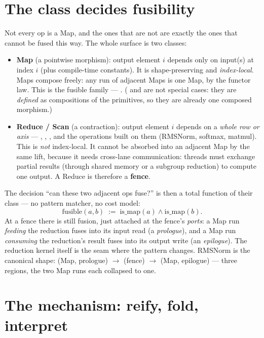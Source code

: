 \documentclass[11pt]{article}
\begin{document}
\section{The class decides fusibility}
\label{sec:class}

Not every op is a Map, and the ones that are not are exactly the ones that cannot be fused this way. The
whole surface is two classes:

\begin{itemize}[leftmargin=1.4em,itemsep=2pt]
\item \textbf{Map} (a pointwise morphism): output element $i$ depends only on input(s) at index $i$
(plus compile-time constants). It is shape-preserving and \emph{index-local}. Maps compose freely: any
run of adjacent Maps is one Map, by the functor law. This is the fusible family ---
. ( and  are
not special cases: they are \emph{defined} as compositions of the primitives, so they are already one
composed morphism.)
\item \textbf{Reduce / Scan} (a contraction): output element $i$ depends on a \emph{whole row or axis}
--- , , , and the operations built on them (RMSNorm, softmax, matmul).
This is \emph{not} index-local. It cannot be absorbed into an adjacent Map by the same lift, because it
needs cross-lane communication: threads must exchange partial results (through shared memory or a
subgroup reduction) to compute one output. A Reduce is therefore a \textbf{fence}.
\end{itemize}

The decision ``can these two adjacent ops fuse?'' is then a total function of their class --- no pattern
matcher, no cost model:
\[
\mathrm{fusible}(a,b)\;:=\;\mathrm{is\_map}(a)\wedge\mathrm{is\_map}(b).
\]
At a fence there is still fusion, just attached at the fence's \emph{ports}: a Map run \emph{feeding} the
reduction fuses into its input read (a \emph{prologue}), and a Map run \emph{consuming} the reduction's
result fuses into its output write (an \emph{epilogue}). The reduction kernel itself is the seam where
the pattern changes. RMSNorm is the canonical shape: (Map, prologue) $\to$ (fence)
$\to$ (Map, epilogue) --- three regions, the two Map runs each collapsed to one.

\section{The mechanism: reify, fold, interpret}
\label{sec:mech}
\end{document}

